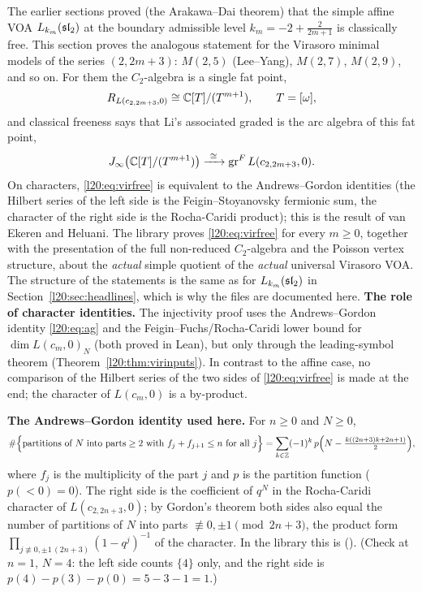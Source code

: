 The earlier sections proved (the Arakawa--Dai theorem) that the simple affine VOA $L_{k_m}(\mathfrak{sl}_2)$ at the boundary
admissible level $k_m = -2+\frac{2}{2m+1}$ is classically free. This section proves the analogous statement for the Virasoro
minimal models of the series $(2,2m+3)$: $M(2,5)$ (Lee--Yang), $M(2,7)$, $M(2,9)$, and so on. For them the $C_2$-algebra
is a single fat point,
\begin{equation*}
R_{L(c_{2,2m+3},0)}\cong{\mathbb{C}}[T]/(T^{m+1}),\qquad T=[\omega],
\end{equation*}
and classical freeness says that Li's associated graded is the arc algebra of this fat point,
\begin{equation}\label{l20:eq:virfree}
J_\infty\bigl({\mathbb{C}}[T]/(T^{m+1})\bigr)\xrightarrow{\ \cong\ }\operatorname{gr}^F L(c_{2,2m+3},0).
\end{equation}
On characters, \eqref{l20:eq:virfree} is equivalent to the Andrews--Gordon identities (the Hilbert series of the
left side is the Feigin--Stoyanovsky fermionic sum, the character of the right side is the Rocha-Caridi product);
this is the result of van Ekeren and Heluani. The library proves \eqref{l20:eq:virfree} for every $m\ge0$, together with
the presentation of the full non-reduced $C_2$-algebra and the Poisson vertex structure, about the
\emph{actual} simple quotient of the \emph{actual} universal Virasoro VOA. The structure of the statements is the
same as for $L_{k_m}(\mathfrak{sl}_2)$ in Section~\ref{l20:sec:headlines}, which is why the files are documented here.
\textbf{The role of character identities.} The injectivity proof uses the Andrews--Gordon identity \eqref{l20:eq:ag} and
the Feigin--Fuchs/Rocha-Caridi lower bound for $\dim L(c_m,0)_N$ (both proved in Lean), but only through the leading-symbol
theorem  (Theorem~\ref{l20:thm:virinputs}). In contrast to the affine case, no comparison of the
Hilbert series of the two sides of \eqref{l20:eq:virfree} is made at the end; the character of $L(c_m,0)$ is a by-product.

\textbf{The Andrews--Gordon identity used here.} For $n\ge0$ and $N\ge0$,
\begin{equation}\label{l20:eq:ag}
\#\Bigl\{\text{partitions of }N\text{ into parts}\ge2\text{ with }f_j+f_{j+1}\le n\text{ for all }j\Bigr\}
=\sum_{k\in{\mathbb{Z}}}(-1)^k\,p\Bigl(N-\tfrac{k((2n+3)k+2n+1)}{2}\Bigr),
\end{equation}
where $f_j$ is the multiplicity of the part $j$ and $p$ is the partition function ($p(<0)=0$). The right side is the
coefficient of $q^N$ in the Rocha-Caridi character of $L(c_{2,2n+3},0)$; by Gordon's theorem both sides also equal the number
of partitions of $N$ into parts $\not\equiv0,\pm1\pmod{2n+3}$, the product form
$\prod_{j\not\equiv0,\pm1\,(2n+3)}(1-q^j)^{-1}$ of the character. In the library this is
 ().
(Check at $n=1$, $N=4$: the left side counts $\{4\}$ only, and the right side is $p(4)-p(3)-p(0)=5-3-1=1$.)

